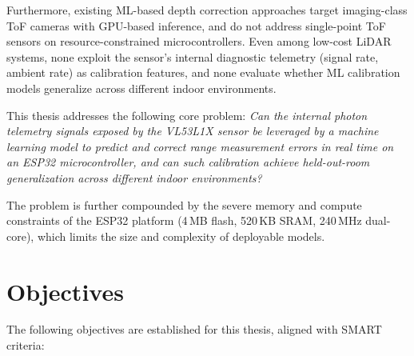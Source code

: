 \documentclass[12pt,a4paper]{article}
\begin{document}
    Furthermore, existing ML-based depth correction approaches \cite{su2018deeptof, agresti2018deep, guo2021tackling} target imaging-class ToF cameras with GPU-based inference, and do not address single-point ToF sensors on resource-constrained microcontrollers. Even among low-cost LiDAR systems, none exploit the sensor's internal diagnostic telemetry (signal rate, ambient rate) as calibration features, and none evaluate whether ML calibration models generalize across different indoor environments.

    This thesis addresses the following core problem: \textit{Can the internal photon telemetry signals exposed by the VL53L1X sensor be leveraged by a machine learning model to predict and correct range measurement errors in real time on an ESP32 microcontroller, and can such calibration achieve held-out-room generalization across different indoor environments?}

    The problem is further compounded by the severe memory and compute constraints of the ESP32 platform (4\,MB flash, 520\,KB SRAM, 240\,MHz dual-core), which limits the size and complexity of deployable models.



    \section{Objectives}

    The following objectives are established for this thesis, aligned with SMART criteria:
\end{document}
